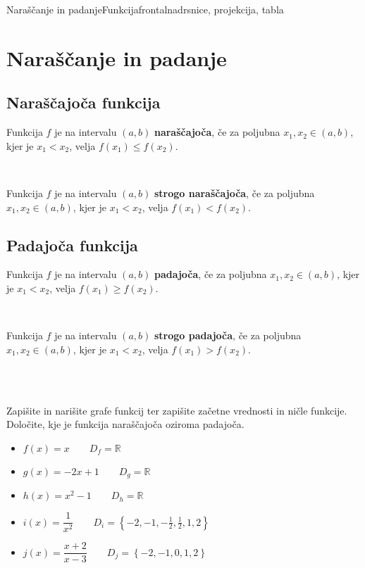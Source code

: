 \begin{priprava}{4}{}{Naraščanje in padanje}{Funkcija}{frontalna}{drsnice, projekcija, tabla}



        \section{Naraščanje in padanje}

            \subsection*{Naraščajoča funkcija}

                Funkcija $f$ je na intervalu $(a,b)$ \textbf{naraščajoča}, če za poljubna $x_1,x_2\in(a,b)$, kjer je $x_1<x_2$, velja $f(x_1)\leq f(x_2)$.

                ~

                Funkcija $f$ je na intervalu $(a,b)$ \textbf{strogo naraščajoča}, če za poljubna $x_1,x_2\in(a,b)$, kjer je $x_1<x_2$, velja $f(x_1)<f(x_2)$.
            

            \subsection*{Padajoča funkcija}
                Funkcija $f$ je na intervalu $(a,b)$ \textbf{padajoča}, če za poljubna $x_1,x_2\in(a,b)$, kjer je $x_1<x_2$, velja $f(x_1)\geq f(x_2)$.
                
                ~

                Funkcija $f$ je na intervalu $(a,b)$ \textbf{strogo padajoča}, če za poljubna $x_1,x_2\in(a,b)$, kjer je $x_1<x_2$, velja $f(x_1)>f(x_2)$.


~\\~\\


            \begin{naloga}
                Zapišite in narišite grafe funkcij ter zapišite začetne vrednosti in ničle funkcije.
                Določite, kje je funkcija naraščajoča oziroma padajoča. %
                    \begin{itemize}
                        \item $f(x)=x \quad \quad D_f=\mathbb{R}$ 
                        \item $g(x)=-2x+1 \quad \quad D_g=\mathbb{R}$ 
                        \item $h(x)=x^2-1 \quad \quad D_h=\mathbb{R}$ 
                        \item $i(x)=\dfrac{1}{x^2} \quad \quad D_i=\left\{-2, -1, -\frac{1}{2}, \frac{1}{2}, 1, 2\right\}$ 
                        \item $j(x)=\dfrac{x+2}{x-3} \quad \quad D_j=\left\{-2, -1, 0, 1, 2\right\}$ 
                    \end{itemize}
            \end{naloga}                    




\end{priprava}